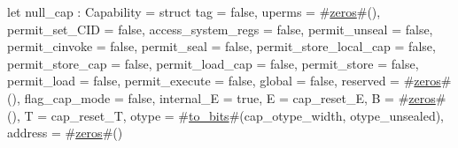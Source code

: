 let null_cap : Capability = struct {
  tag                    = false,
  uperms                 = #\hyperref[sailRISCVzzzeros]{zeros}#(),
  permit_set_CID         = false,
  access_system_regs     = false,
  permit_unseal          = false,
  permit_cinvoke         = false,
  permit_seal            = false,
  permit_store_local_cap = false,
  permit_store_cap       = false,
  permit_load_cap        = false,
  permit_store           = false,
  permit_load            = false,
  permit_execute         = false,
  global                 = false,
  reserved               = #\hyperref[sailRISCVzzzeros]{zeros}#(),
  flag_cap_mode          = false,
  internal_E             = true,
  E                      = cap_reset_E,
  B                      = #\hyperref[sailRISCVzzzeros]{zeros}#(),
  T                      = cap_reset_T,
  otype                  = #\hyperref[sailRISCVztozybits]{to\_bits}#(cap_otype_width, otype_unsealed),
  address                = #\hyperref[sailRISCVzzzeros]{zeros}#()
}
